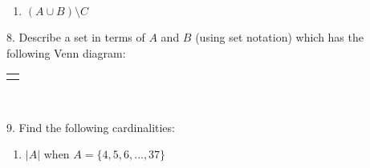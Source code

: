 \documentclass[10pt,]{book}
\theoremstyle{plain}
\theoremstyle{definition}
\theoremstyle{definition}
\theoremstyle{definition}
\theoremstyle{definition}
\numberwithin{equation}{chapter}
\newlength{\panelmax}
\begin{document}
\begin{exerciselist}
\begin{enumerate}[label=(\alph*)]
\item\hypertarget{li-312}{}\((A \cup B) \setminus C\)%
\end{enumerate}
%
\par\smallskip
\item[8.]\hypertarget{exercise-75}{}\hypertarget{p-655}{}%
Describe a set in terms of \(A\) and \(B\) (using set notation) which has the following Venn diagram:%
{%
\setlength{\panelmax}{0pt}
\ifdefined\panelboxAimage\else\newsavebox{\panelboxAimage}\fi%
\begin{lrbox}{\panelboxAimage}
\end{lrbox}
\ifdefined\phAimage\else\newlength{\phAimage}\fi%
\setlength{\phAimage}{\ht\panelboxAimage+\dp\panelboxAimage}
\settototalheight{\phAimage}{\usebox{\panelboxAimage}}
\setlength{\panelmax}{\maxof{\panelmax}{\phAimage}}
\leavevmode%
\setlength{\tabcolsep}{0\linewidth}
\par\medskip\noindent
\hspace*{0.4\linewidth}%
\begin{tabular}{@{}*{1}{c}@{}}
\begin{minipage}[c][\panelmax][t]{0.2\linewidth}\usebox{\panelboxAimage}\end{minipage}\end{tabular}\\
}%
\par\smallskip
\item[9.]\hypertarget{exercise-76}{}\hypertarget{p-656}{}%
Find the following cardinalities: \leavevmode%
\begin{enumerate}[label=(\alph*)]
\item\hypertarget{li-319}{}\(|A|\) when \(A = \{4,5,6,\ldots,37\}\)%

\end{enumerate}
\end{exerciselist}
\end{document}
